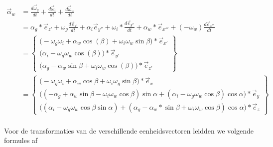 \documentclass[a4paper,10pt]{article}
\begin{document}
\begin{equation}
\begin{aligned}
\vec{\alpha}_{w} &= \frac{d\vec{\omega}_{g}}{dt} + \frac{d\vec{\omega}_{i}}{dt} + \frac{d\vec{\omega}_{w}}{dt}\\
&= \alpha_g *  \vec{e}_{z'} + \omega_g  \frac{d\vec{e}_{z'}}{dt} + \alpha_i   \vec{e}_{y''} + \omega_i * \frac{d\vec{e}_{y''}}{dt} + \alpha_w * \vec{e}_{x'''} + (-\omega_w)  \frac{d\vec{e}_{x'''}}{dt}\\
&=\begin{Bmatrix}
\Big(- {\omega}_{g} {\omega}_{i} + \alpha_w\cos(\beta) +\omega_i\omega_w \sin{\beta} \Big)*\vec{e}_{x'} \\
\Big(\alpha_i - \omega_g\omega_w\cos(\beta)\Big)*\vec{e}_{y'}\\
\Big(\alpha_g  -\alpha_w\sin{\beta}+ \omega_i\omega_w\cos(\beta)\Big)*\vec{e}_{z'}
\end{Bmatrix}\\
&=\begin{Bmatrix}
\Big(- {\omega}_{g}  {\omega}_{i} + \alpha_w\cos{\beta} +\omega_i\omega_g\sin{\beta} \Big)* \vec{e}_{x} \\
\Big((-\alpha_g  +\alpha_w\sin{\beta}- \omega_i\omega_w\cos{\beta}) \sin{\alpha} + (\alpha_i - \omega_g\omega_w\cos{\beta})\cos{\alpha}  \Big) * \vec{e}_{y} \\
\Big((\alpha_i - \omega_g\omega_w\cos{\beta}\sin{\alpha}) + (\alpha_g  -\alpha_w*\sin{\beta}+ \omega_i\omega_w\cos{\beta}) \cos{\alpha} \Big) * \vec{e}_{z}
\end{Bmatrix}
\end{aligned}
\end{equation}\\
Voor de transformaties van de verschillende eenheidsvectoren leidden we volgende formules af \\
\end{document}
